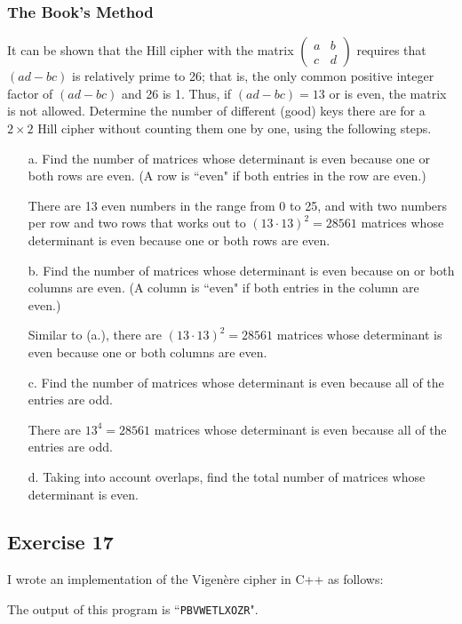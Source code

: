 \documentclass[12pt]{article}
\begin{document}
\subsubsection*{The Book's Method}
It can be shown that the Hill cipher with the matrix $\left(\begin{matrix} a & b \\ c & d\end{matrix}\right)$ requires that $\left(ad - bc\right)$ is relatively prime to 26; that is, the only common positive integer factor of $\left(ad - bc\right)$ and 26 is 1. Thus, if $\left(ad - bc\right) = 13$ or is even, the matrix is not allowed. Determine the number of different (good) keys there are for a $2 \times 2$ Hill cipher without counting them one by one, using the following steps.
\begin{itemize}
\item[a.] Find the number of matrices whose determinant is even because one or both rows are even. (A row is ``even" if both entries in the row are even.)

There are 13 even numbers in the range from 0 to 25, and with two numbers per row and two rows that works out to $\left(13 \cdot 13\right)^2 = 28561$ matrices whose determinant is even because one or both rows are even.

\item[b.] Find the number of matrices whose determinant is even because on or both columns are even. (A column is ``even" if both entries in the column are even.)

Similar to (a.), there are $\left(13 \cdot 13\right)^2 = 28561$ matrices whose determinant is even because one or both columns are even.

\item[c.] Find the number of matrices whose determinant is even because all of the entries are odd.

There are $13^4 = 28561$ matrices whose determinant is even because all of the entries are odd.

\item[d.] Taking into account overlaps, find the total number of matrices whose determinant is even.
\end{itemize}

\subsection*{Exercise 17}
I wrote an implementation of the Vigen\`{e}re cipher in C++ as follows:

The output of this program is ``{\tt PBVWETLXOZR}".
\end{document}

